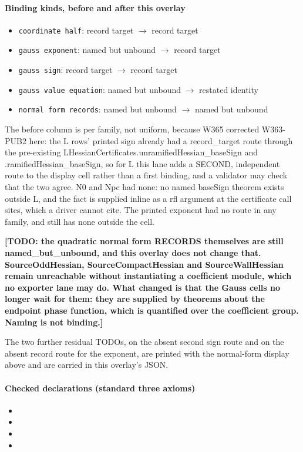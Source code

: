 \paragraph{Binding kinds, before and after this overlay}
\begin{itemize}
\item \texttt{coordinate half}: record target $\to$ record target
\item \texttt{gauss exponent}: named but unbound $\to$ record target
\item \texttt{gauss sign}: record target $\to$ record target
\item \texttt{gauss value equation}: named but unbound $\to$ restated identity
\item \texttt{normal form records}: named but unbound $\to$ named but unbound
\end{itemize}
\par\noindent The before column is per family, not uniform, because W365 corrected W363-PUB2 here: the L rows' printed sign already had a record\_target route through the pre-existing LHessianCertificates.unramifiedHessian\_baseSign and .ramifiedHessian\_baseSign, so for L this lane adds a SECOND, independent route to the display cell rather than a first binding, and a validator may check that the two agree. N0 and Npc had none: no named baseSign theorem exists outside L, and the fact is supplied inline as a rfl argument at the certificate call sites, which a driver cannot cite. The printed exponent had no route in any family, and still has none outside the cell.
\par\noindent\textbf{[TODO: the quadratic normal form RECORDS themselves are still named\_but\_unbound, and this overlay does not change that. SourceOddHessian, SourceCompactHessian and SourceWallHessian remain unreachable without instantiating a coefficient module, which no exporter lane may do. What changed is that the Gauss cells no longer wait for them: they are supplied by theorems about the endpoint phase function, which is quantified over the coefficient group. Naming is not binding.]}
\par\noindent The two further residual TODOs, on the absent second sign route and on the absent record route for the exponent, are printed with the normal-form display above and are carried in this overlay's JSON.
\paragraph{Checked declarations (standard three axioms)}
\begin{itemize}
\item {}
\item {}
\item {}
\item {}
\end{itemize}
